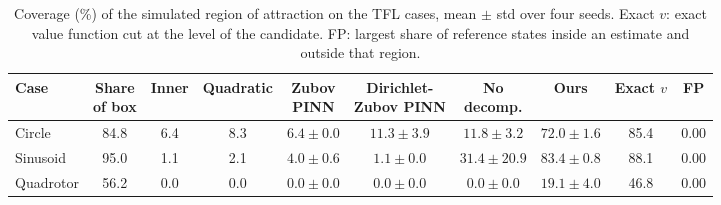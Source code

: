 \begin{table}[t]
\centering\footnotesize\setlength{\tabcolsep}{4pt}
\caption{Coverage (\%) of the simulated region of attraction on the TFL cases, mean $\pm$ std over four seeds. Exact $v$: exact value function cut at the level of the candidate. FP: largest share of reference states inside an estimate and outside that region.}
\label{tab:main}
\begin{tabular}{@{}lccccccccc@{}}
\toprule
Case & \shortstack{Share\\of box} & Inner & Quadratic & \shortstack{Zubov\\PINN} & \shortstack{Dirichlet-\\Zubov PINN} & \shortstack{No\\decomp.} & Ours & Exact $v$ & FP\\
\midrule
Circle & 84.8 & 6.4 & 8.3 & $6.4\pm0.0$ & $11.3\pm3.9$ & $11.8\pm3.2$ & $72.0\pm1.6$ & 85.4 & 0.00\\
Sinusoid & 95.0 & 1.1 & 2.1 & $4.0\pm0.6$ & $1.1\pm0.0$ & $31.4\pm20.9$ & $83.4\pm0.8$ & 88.1 & 0.00\\
Quadrotor & 56.2 & 0.0 & 0.0 & $0.0\pm0.0$ & $0.0\pm0.0$ & $0.0\pm0.0$ & $19.1\pm4.0$ & 46.8 & 0.00\\
\bottomrule
\end{tabular}
\end{table}
